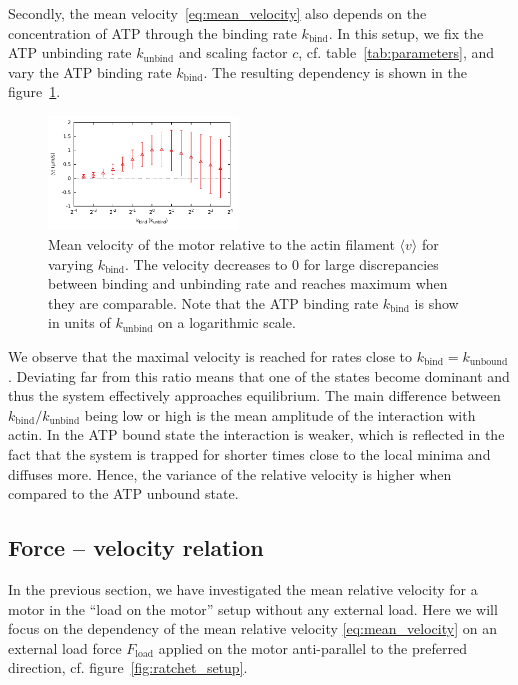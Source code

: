 \documentclass[aps,pre,twocolumn,showpacs,showkeys,superscriptaddress,floatfix]{revtex4-1}
\begin{document}
Secondly, the mean velocity~\eqref{eq:mean_velocity} also depends on the concentration of ATP through the binding rate $k_\text{bind}$. 
In this setup, we fix the ATP unbinding rate $k_\text{unbind}$ and scaling factor $c$, cf. table~\ref{tab:parameters}, and vary the ATP binding rate $k_\text{bind}$. 
The resulting dependency is shown in the figure~\ref{fig:v_k}. 
\begin{figure}[t]
\centering
\includegraphics[width=0.45\textwidth,height=!]{v_k}
\caption{
\label{fig:v_k} 
Mean velocity of the motor relative to the actin filament $\langle v \rangle$ for varying $k_\text{bind}$.
The velocity decreases to $0$ for large discrepancies between binding and unbinding rate and reaches maximum when they are comparable.
Note that the ATP binding rate $k_\text{bind}$ is show in units of $k_\text{unbind}$ on a logarithmic scale.
}
\end{figure}
We observe that the maximal velocity is reached for rates close to $k_\text{bind} = k_\text{unbound}$. 
Deviating far from this ratio means that one of the states become dominant and thus the system effectively approaches equilibrium.  
The main difference between $k_\text{bind}/k_\text{unbind}$ being low or high is the mean amplitude of the interaction with actin. 
In the ATP bound state the interaction is weaker, 
which is reflected in the fact that the system is trapped for shorter times close to the local minima and diffuses more. 
Hence, the variance of the relative velocity is higher when compared to the ATP unbound state. 


\subsection{Force -- velocity relation}
\label{sec:force-velocity}
In the previous section, we have investigated the mean relative velocity for a motor in the ``load on the motor'' setup without any external load. 
Here we will focus on the dependency of the mean relative velocity \eqref{eq:mean_velocity} on an external load force $F_\text{load}$ applied on the motor anti-parallel to the preferred direction, 
cf. figure~\ref{fig:ratchet_setup}.
\end{document}
